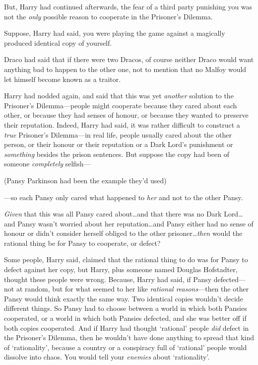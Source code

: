 But, Harry had continued afterwards, the fear of a third party punishing you was not the \emph{only} possible reason to cooperate in the Prisoner’s Dilemma.

Suppose, Harry had said, you were playing the game against a magically produced identical copy of yourself.

Draco had said that if there were two Dracos, of course neither Draco would want anything bad to happen to the other one, not to mention that no Malfoy would let himself become known as a traitor.

Harry had nodded again, and said that this was yet \emph{another} solution to the Prisoner’s Dilemma—people might cooperate because they cared about each other, or because they had senses of honour, or because they wanted to preserve their reputation. Indeed, Harry had said, it was rather difficult to construct a \emph{true} Prisoner’s Dilemma—in real life, people usually cared about the other person, or their honour or their reputation or a Dark Lord’s punishment or \emph{something} besides the prison sentences. But suppose the copy had been of someone \emph{completely} selfish—

(Pansy Parkinson had been the example they’d used)

—so each Pansy only cared what happened to \emph{her} and not to the other Pansy.

\emph{Given} that this was all Pansy cared about…and that there was no Dark Lord…and Pansy wasn’t worried about her reputation…and Pansy either had no sense of honour or didn’t consider herself obliged to the other prisoner…\emph{then} would the rational thing be for Pansy to cooperate, or defect?

Some people, Harry said, claimed that the rational thing to do was for Pansy to defect against her copy, but Harry, plus someone named Douglas Hofstadter, thought these people were wrong. Because, Harry had said, if Pansy defected—not at random, but for what seemed to her like \emph{rational reasons}—then the other Pansy would think exactly the same way. Two identical copies wouldn’t decide different things. So Pansy had to choose between a world in which both Pansies cooperated, or a world in which both Pansies defected, and she was better off if both copies cooperated. And if Harry had thought ‘rational’ people \emph{did} defect in the Prisoner’s Dilemma, then he wouldn’t have done anything to spread that kind of ‘rationality’, because a country or a conspiracy full of ‘rational’ people would dissolve into chaos. You would tell your \emph{enemies} about ‘rationality’.

